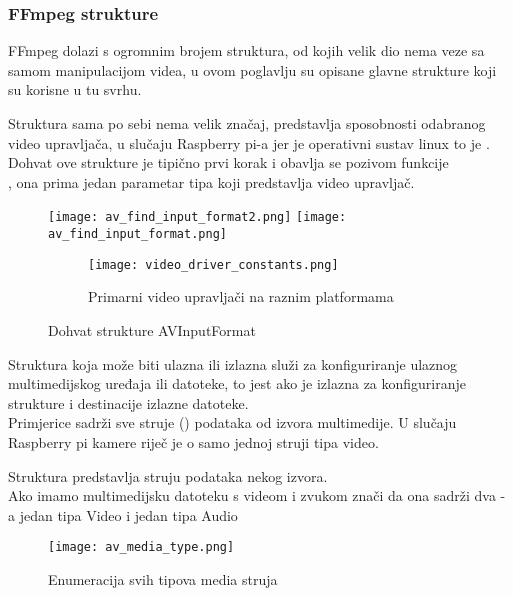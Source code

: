 \clearpage
\subsubsection{FFmpeg strukture}
FFmpeg dolazi s ogromnim brojem struktura, od kojih velik dio nema veze sa samom manipulacijom videa,
u ovom poglavlju su opisane glavne strukture koji su korisne u tu svrhu.

{} \label{sec:input_format}
Struktura  sama po sebi nema velik značaj, predstavlja sposobnosti odabranog video upravljača, u
slučaju Raspberry pi-a jer je operativni sustav linux to je \hyperref[sct:v4l2]{}. \cite{ffmpegDocs} \cite{linuxKernelDocs}
\paraBreak
Dohvat ove strukture je tipično prvi korak i obavlja se pozivom funkcije \\
, ona prima jedan parametar tipa  koji predstavlja video upravljač.
\begin{figure}[h]
  \texttt{[image: av\_find\_input\_format2.png]}
  \texttt{[image: av\_find\_input\_format.png]}
  \begin{subfigure}{\textwidth}
    \texttt{[image: video\_driver\_constants.png]}
    \caption{Primarni video upravljači na raznim platformama}
  \end{subfigure}
  \caption{Dohvat strukture AVInputFormat}
\end{figure}

\clearpage
{} \label{sec:avformat_context}
Struktura  koja može biti ulazna ili izlazna služi za konfiguriranje ulaznog multimedijskog
uređaja ili datoteke, to jest ako je izlazna za konfiguriranje strukture i destinacije izlazne datoteke. 
\\
Primjerice sadrži sve struje () podataka od izvora multimedije. U slučaju Raspberry pi kamere riječ je o samo
jednoj struji tipa video. \cite{ffmpegDocs}

 \label{sec:avstream}
Struktura  predstavlja struju podataka nekog izvora. 
\\
Ako imamo multimedijsku datoteku s videom i zvukom znači da ona sadrži dva -a jedan tipa Video i jedan
tipa Audio \cite{ffmpegDocs}
\begin{figure}[h]
  \texttt{[image: av\_media\_type.png]}
  \caption[Enumeracija svih tipova media struja]{Enumeracija svih tipova media struja \cite{ffmpegDocs}}
\end{figure}

